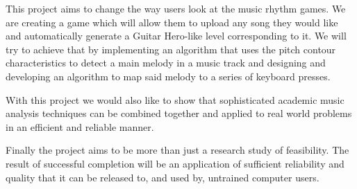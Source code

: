 This project aims to change the way users look at the music rhythm games. We are creating a game which will allow them to upload any song they would like and automatically generate a Guitar Hero-like level corresponding to it. We will try to achieve that by implementing an algorithm that uses the pitch contour characteristics to detect a main melody in a music track and designing and developing an algorithm to map said melody to a series of keyboard presses.

With this project we would also like to show that sophisticated academic music analysis techniques can be combined together and applied to real world problems in an efficient and reliable manner. 

Finally the project aims to be more than just a research study of feasibility. The result of successful completion will be an application of sufficient reliability and quality that it can be released to, and used by, untrained computer users. 

